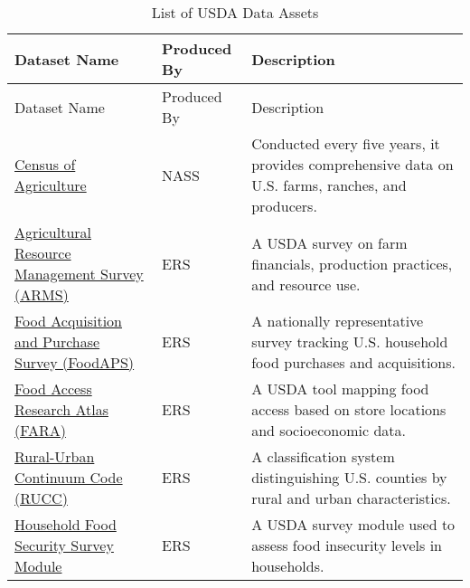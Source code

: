 \documentclass[
  letterpaper,
  DIV=11,
  numbers=noendperiod]{scrartcl}
\begin{document}
\begin{longtable}[]{@{}
  >{\raggedright\arraybackslash}p{}
  >{\raggedright\arraybackslash}p{}
  >{\raggedright\arraybackslash}p{}@{}}
\caption{List of USDA Data
Assets}\label{tbl-usda-datasets}\tabularnewline
\toprule\noalign{}
\begin{minipage}[b]{\linewidth}\raggedright
Dataset Name
\end{minipage} & \begin{minipage}[b]{\linewidth}\raggedright
Produced By
\end{minipage} & \begin{minipage}[b]{\linewidth}\raggedright
Description
\end{minipage} \\
\midrule\noalign{}
\endfirsthead
\toprule\noalign{}
\begin{minipage}[b]{\linewidth}\raggedright
Dataset Name
\end{minipage} & \begin{minipage}[b]{\linewidth}\raggedright
Produced By
\end{minipage} & \begin{minipage}[b]{\linewidth}\raggedright
Description
\end{minipage} \\
\midrule\noalign{}
\endhead
\bottomrule\noalign{}
\endlastfoot
\href{https://www.nass.usda.gov/AgCensus/}{Census of Agriculture} & NASS
& Conducted every five years, it provides comprehensive data on U.S.
farms, ranches, and producers. \\
\href{https://www.ers.usda.gov/data-products/arms-farm-financial-and-crop-production-practices/}{Agricultural
Resource Management Survey (ARMS)} & ERS & A USDA survey on farm
financials, production practices, and resource use. \\
\href{https://www.ers.usda.gov/data-products/foodaps-national-household-food-acquisition-and-purchase-survey/}{Food
Acquisition and Purchase Survey (FoodAPS)} & ERS & A nationally
representative survey tracking U.S. household food purchases and
acquisitions. \\
\href{https://www.ers.usda.gov/data-products/food-access-research-atlas/}{Food
Access Research Atlas (FARA)} & ERS & A USDA tool mapping food access
based on store locations and socioeconomic data. \\
\href{https://www.ers.usda.gov/data-products/rural-urban-continuum-codes/}{Rural-Urban
Continuum Code (RUCC)} & ERS & A classification system distinguishing
U.S. counties by rural and urban characteristics. \\
\href{https://www.ers.usda.gov/topics/food-nutrition-assistance/food-security-in-the-u-s/survey-tools/}{Household
Food Security Survey Module} & ERS & A USDA survey module used to assess
food insecurity levels in households. \\
\end{longtable}
\end{document}
